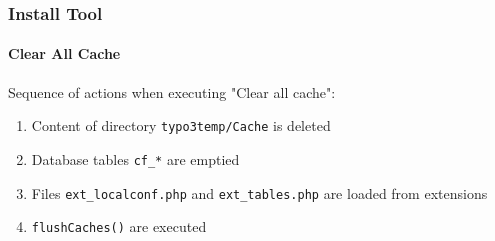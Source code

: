 
\begin{frame}[fragile]
	\frametitle{Install Tool}
	\framesubtitle{Clear All Cache}

	Sequence of actions when executing "Clear all cache":

	\begin{enumerate}
		\item Content of directory \texttt{typo3temp/Cache} is deleted
		\item Database tables \texttt{cf\_*} are emptied
		\item Files \texttt{ext\_localconf.php} and \texttt{ext\_tables.php}\newline
			are loaded from extensions
		\item \texttt{flushCaches()} are executed
	\end{enumerate}

\end{frame}


